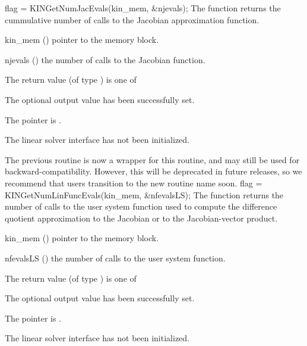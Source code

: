 {
  flag = KINGetNumJacEvals(kin\_mem, \&njevals);
}
{
  The function  returns the cummulative
  number of calls to the {\kinls} Jacobian approximation function.
}
{
  \begin{args}
  \item[kin\_mem] ()
    pointer to the {\kinsol} memory block.
  \item[njevals] ()
    the number of calls to the Jacobian function.
  \end{args}
}
{
  The return value  (of type ) is one of
  \begin{args}
  \item[\Id{KINLS\_SUCCESS}]
    The optional output value has been successfully set.
  \item[\Id{KINLS\_MEM\_NULL}]
    The  pointer is .
  \item[\Id{KINLS\_LMEM\_NULL}]
    The {\kinls} linear solver interface has not been initialized.
  \end{args}
}
{
  The previous routine  is now a wrapper for
  this routine, and may still be used for backward-compatibility.
  However, this will be deprecated in future releases, so we recommend
  that users transition to the new routine name soon.
}
{
  flag = KINGetNumLinFuncEvals(kin\_mem, \&nfevalsLS);
}
{
  The function  returns the number of calls
  to the user system function used to compute the difference quotient
  approximation to the Jacobian or to the Jacobian-vector product.
}
{
  \begin{args}
  \item[kin\_mem] ()
    pointer to the {\kinsol} memory block.
  \item[nfevalsLS] ()
    the number of calls to the user system function.
  \end{args}
}
{
  The return value  (of type ) is one of
  \begin{args}
  \item[\Id{KINLS\_SUCCESS}]
    The optional output value has been successfully set.
  \item[\Id{KINLS\_MEM\_NULL}]
    The  pointer is .
  \item[\Id{KINLS\_LMEM\_NULL}]
    The {\kinls} linear solver interface has not been initialized.
  \end{args}
}
